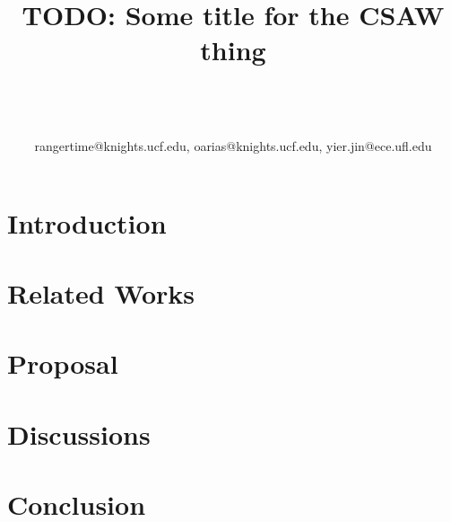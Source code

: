 \documentclass[10pt,twocolumn]{IEEEtran}
\begin{document}
\title{TODO: Some title for the CSAW thing}

\author{\\
\\
\\
{rangertime@knights.ucf.edu, oarias@knights.ucf.edu, yier.jin@ece.ufl.edu}\vspace{-0.16in}\vspace{-0.2in}}

\maketitle
\pagestyle{empty}
\thispagestyle{empty}

\begin{abstract}

\end{abstract}

\section{Introduction}

\section{Related Works} \label{sec:related}

\section{Proposal}

\section{Discussions}\label{sec:discussion}

\section{Conclusion} \label{sec:conclusion}

\vspace{-0.08in}
\raggedright


\end{document}
